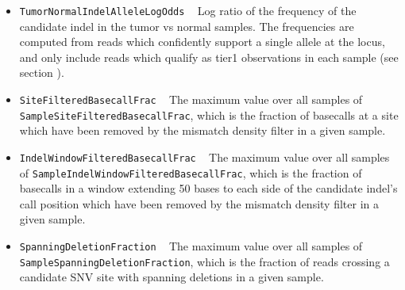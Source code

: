 \documentclass{article}
\begin{document}
\begin{itemize}
    \item \texttt{TumorNormalIndelAlleleLogOdds} ~ Log ratio of the frequency of the candidate indel in the tumor vs normal samples. The frequencies are computed from reads which confidently support a single allele at the locus, and only include reads which qualify as tier1 observations in each sample (see section ).

    \item \texttt{SiteFilteredBasecallFrac} ~ The maximum value over all samples of \texttt{SampleSiteFilteredBasecallFrac}, which is the fraction of basecalls at a site which have been removed by the mismatch density filter in a given sample.

    \item \texttt{IndelWindowFilteredBasecallFrac} ~ The maximum value over all samples of \texttt{SampleIndelWindowFilteredBasecallFrac}, which is the fraction of basecalls in a window extending 50 bases to each side of the candidate indel's call position which have been removed by the mismatch density filter in a given sample.

    \item \texttt{SpanningDeletionFraction} ~ The maximum value over all samples of \texttt{SampleSpanningDeletionFraction}, which is the fraction of reads crossing a candidate SNV site with spanning deletions in a given sample.
\end{itemize}



\end{document}
